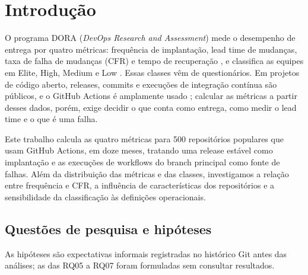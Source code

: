 
\section{Introdução}
\label{sec:introducao}

O programa DORA (\textit{DevOps Research and Assessment}) mede o desempenho de
entrega por quatro métricas: frequência de implantação, lead time de mudanças,
taxa de falha de mudanças (CFR) e tempo de recuperação
\cite{forsgren2018accelerate}, e classifica as equipes em Elite, High, Medium e
Low \cite{dora2021}. Essas classes vêm de questionários. Em projetos de código
aberto, releases, commits e execuções de integração contínua são públicos, e o
GitHub Actions é amplamente usado \cite{kinsman2021actions, decan2022actions};
calcular as métricas a partir desses dados, porém, exige decidir o que conta
como entrega, como medir o lead time e o que é uma falha.

Este trabalho calcula as quatro métricas para 500 repositórios populares que
usam GitHub Actions, em doze meses, tratando uma release estável como
implantação e as execuções de workflows do branch principal como fonte de
falhas. Além da distribuição das métricas e das classes, investigamos a
relação entre frequência e CFR, a influência de características dos
repositórios e a sensibilidade da classificação às definições operacionais.

\subsection{Questões de pesquisa e hipóteses}
\label{sec:hipoteses}
As hipóteses são expectativas informais registradas no histórico Git antes das
análises; as das RQ05 a RQ07 foram formuladas sem consultar resultados.


